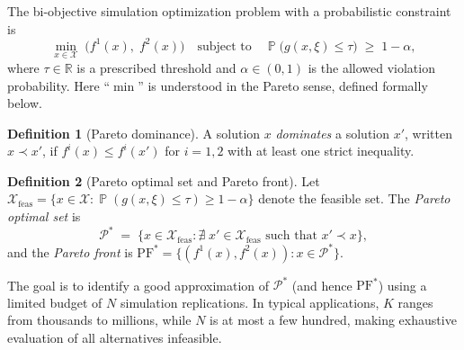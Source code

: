 \documentclass[12pt]{article}
\theoremstyle{plain}
\theoremstyle{definition}
\newtheorem{definition}{Definition}[section]
\theoremstyle{remark}
\DeclareMathOperator{\Prob}{\mathbb{P}}
\newcommand{\R}{\mathbb{R}}
\newcommand{\cX}{\mathcal{X}}
\newcommand{\cP}{\mathcal{P}}
\begin{document}
The bi-objective simulation optimization problem with a probabilistic
constraint is
\begin{equation}\label{eq:main_problem}
  \min_{x\in\cX}\;\bigl(f^1(x),\;f^2(x)\bigr)
  \quad\text{subject to}\quad
  \Prob\bigl(g(x,\xi)\le\tau\bigr)\;\ge\;1-\alpha,
\end{equation}
where $\tau\in\R$ is a prescribed threshold and
$\alpha\in(0,1)$ is the allowed violation probability.  Here
``$\min$'' is understood in the Pareto sense, defined formally below.

\begin{definition}[Pareto dominance]\label{def:dominance}
A solution $x$ \emph{dominates} a solution $x'$, written
$x\prec x'$, if $f^i(x)\le f^i(x')$ for $i=1,2$ with
at least one strict inequality.
\end{definition}

\begin{definition}[Pareto optimal set and Pareto front]\label{def:pareto}
Let $\cX_{\mathrm{feas}}=\{x\in\cX:\Prob(g(x,\xi)\le\tau)\ge
1-\alpha\}$ denote the feasible set.  The \emph{Pareto optimal set}
is
\begin{equation}\label{eq:pareto_set}
  \cP^* \;=\; \bigl\{x\in\cX_{\mathrm{feas}} :
  \nexists\;x'\in\cX_{\mathrm{feas}} \text{ such that }
  x'\prec x \bigr\},
\end{equation}
and the \emph{Pareto front} is
$\mathrm{PF}^*=\{(f^1(x),f^2(x)):x\in\cP^*\}$.
\end{definition}

The goal is to identify a good approximation of $\cP^*$ (and hence
$\mathrm{PF}^*$) using a limited budget of $N$ simulation
replications.  In typical applications, $K$ ranges from thousands to
millions, while $N$ is at most a few hundred, making exhaustive
evaluation of all alternatives infeasible.
\end{document}
